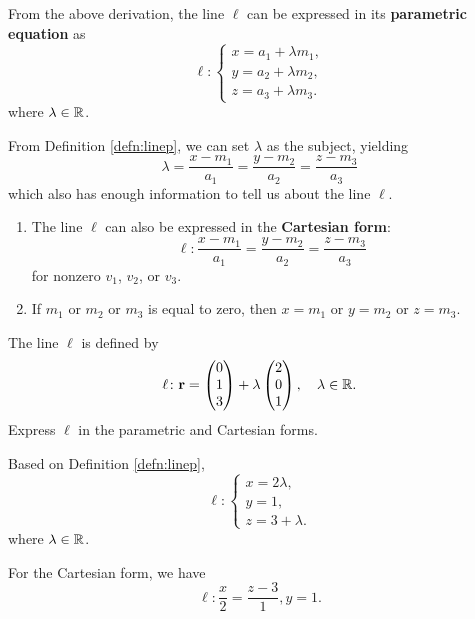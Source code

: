 \documentclass[12pt]{article}
\renewcommand{\vec}{\mathbf}
\begin{document}
\begin{defn} \label{defn:linep}
	From the above derivation, the line \(\ell\) can be expressed in its \textbf{parametric equation} as
	\[ \ell \colon 
	\begin{cases}
		x = a_1 + \lambda m_1, \\
		y = a_2 + \lambda m_2, \\
		z = a_3 + \lambda m_3.
	\end{cases}\] 
	where \(\lambda \in \mathbb{R}\).
\end{defn}
From Definition \ref{defn:linep}, we can set \(\lambda\) as the subject, yielding
\[ \lambda = \frac{x - m_1}{a_1} = \frac{y - m_2}{a_2} = \frac{z - m_3}{a_3} \] 
which also has enough information to tell us about the line \(\ell\).
\begin{defn}
	\begin{enumerate}
		\item The line \(\ell\) can also be expressed in the \textbf{Cartesian form}:
		\[ \ell \colon \frac{x - m_1}{a_1} = \frac{y - m_2}{a_2} = \frac{z - m_3}{a_3} \] 
		for nonzero \(v_1\), \(v_2\), or \(v_3\).
		\item If \(m_1\) or \(m_2\) or \(m_3\) is equal to zero, then \(x = m_1\) or \(y = m_2\) or \(z = m_3\).
	\end{enumerate}
\end{defn}

\begin{eg}
	The line \(\ell\) is defined by
	\[ \ell \colon \vec{r} = \cvec{0 \\ 1 \\ 3} + \lambda \cvec{2 \\ 0 \\ 1}, \quad \lambda \in \R. \]
	Express \(\ell\) in the parametric and Cartesian forms.
	\begin{soln}
		Based on Definition \ref{defn:linep}, 
		\[ \ell \colon 
		\begin{cases}
			x = 2 \lambda, \\
			y = 1, \\
			z = 3 + \lambda.
		\end{cases}\] 
		where \(\lambda \in \mathbb{R}\).

		For the Cartesian form, we have
		\[ \ell \colon \frac{x}{2} = \frac{z - 3}{1}, y = 1. \] 
	\end{soln}
\end{eg}
\end{document}
